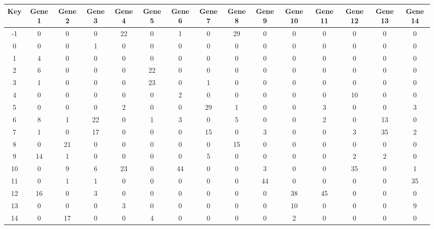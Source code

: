 \begin{tabular}{|c|c|c|c|c|c|c|c|c|c|c|c|c|c|c|}
\hline
Key & Gene 1 & Gene 2 & Gene 3 & Gene 4 & Gene 5 & Gene 6 & Gene 7 & Gene 8 & Gene 9 & Gene 10 & Gene 11 & Gene 12 & Gene 13 & Gene 14 \\
\hline
-1 & 0 & 0 & 0 & 22 & 0 & 1 & 0 & 29 & 0 & 0 & 0 & 0 & 0 & 0 \\
0 & 0 & 0 & 1 & 0 & 0 & 0 & 0 & 0 & 0 & 0 & 0 & 0 & 0 & 0 \\
1 & 4 & 0 & 0 & 0 & 0 & 0 & 0 & 0 & 0 & 0 & 0 & 0 & 0 & 0 \\
2 & 6 & 0 & 0 & 0 & 22 & 0 & 0 & 0 & 0 & 0 & 0 & 0 & 0 & 0 \\
3 & 1 & 0 & 0 & 0 & 23 & 0 & 1 & 0 & 0 & 0 & 0 & 0 & 0 & 0 \\
4 & 0 & 0 & 0 & 0 & 0 & 2 & 0 & 0 & 0 & 0 & 0 & 10 & 0 & 0 \\
5 & 0 & 0 & 0 & 2 & 0 & 0 & 29 & 1 & 0 & 0 & 3 & 0 & 0 & 3 \\
6 & 8 & 1 & 22 & 0 & 1 & 3 & 0 & 5 & 0 & 0 & 2 & 0 & 13 & 0 \\
7 & 1 & 0 & 17 & 0 & 0 & 0 & 15 & 0 & 3 & 0 & 0 & 3 & 35 & 2 \\
8 & 0 & 21 & 0 & 0 & 0 & 0 & 0 & 15 & 0 & 0 & 0 & 0 & 0 & 0 \\
9 & 14 & 1 & 0 & 0 & 0 & 0 & 5 & 0 & 0 & 0 & 0 & 2 & 2 & 0 \\
10 & 0 & 9 & 6 & 23 & 0 & 44 & 0 & 0 & 3 & 0 & 0 & 35 & 0 & 1 \\
11 & 0 & 1 & 1 & 0 & 0 & 0 & 0 & 0 & 44 & 0 & 0 & 0 & 0 & 35 \\
12 & 16 & 0 & 3 & 0 & 0 & 0 & 0 & 0 & 0 & 38 & 45 & 0 & 0 & 0 \\
13 & 0 & 0 & 0 & 3 & 0 & 0 & 0 & 0 & 0 & 10 & 0 & 0 & 0 & 9 \\
14 & 0 & 17 & 0 & 0 & 4 & 0 & 0 & 0 & 0 & 2 & 0 & 0 & 0 & 0 \\
\hline
\end{tabular}